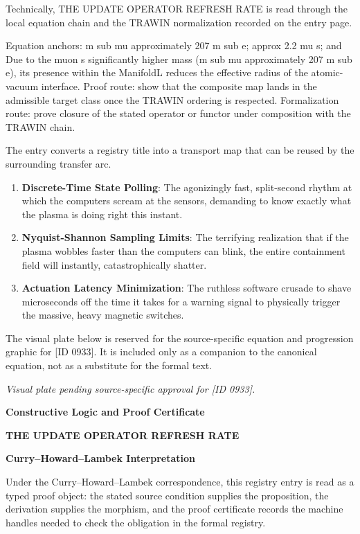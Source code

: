 Technically, THE UPDATE OPERATOR REFRESH RATE is read through the local equation chain and the TRAWIN normalization recorded on the entry page.

Equation anchors: m sub mu approximately 207 m sub e; approx 2.2 mu s; and Due to the muon s significantly higher mass (m sub mu approximately 207 m sub e), its presence within the ManifoldL reduces the effective radius of the atomic-vacuum interface. Proof route: show that the composite map lands in the admissible target class once the TRAWIN ordering is respected. Formalization route: prove closure of the stated operator or functor under composition with the TRAWIN chain.

The entry converts a registry title into a transport map that can be reused by the surrounding transfer arc.
\endgroup

\begin{enumerate}[leftmargin=1.6em,itemsep=6pt,topsep=4pt]
\item \textbf{Discrete-Time State Polling}: The agonizingly fast, split-second rhythm at which the computers scream at the sensors, demanding to know exactly what the plasma is doing right this instant.
\item \textbf{Nyquist-Shannon Sampling Limits}: The terrifying realization that if the plasma wobbles faster than the computers can blink, the entire containment field will instantly, catastrophically shatter.
\item \textbf{Actuation Latency Minimization}: The ruthless software crusade to shave microseconds off the time it takes for a warning signal to physically trigger the massive, heavy magnetic switches.
\end{enumerate}

\begingroup\footnotesize\sloppy
The visual plate below is reserved for the source-specific equation and progression graphic for [ID 0933]. It is included only as a companion to the canonical equation, not as a substitute for the formal text.
\par\endgroup
\begingroup\footnotesize\itshape
Visual plate pending source-specific approval for [ID 0933].
\par\endgroup

\clearpage
\begingroup\tzpsupportsetup
\noindent\textbf{\fontsize{10.8pt}{12.8pt}\selectfont [ID 0933] Constructive Logic and Proof Certificate}\par
\noindent\textbf{\fontsize{10pt}{12pt}\selectfont THE UPDATE OPERATOR REFRESH RATE}\par
\vspace{0.45em}
\begingroup
\footnotesize
\setlength{\parskip}{0.22em}
\setlength{\parindent}{0pt}
\noindent\textbf{Curry--Howard--Lambek Interpretation}\par
Under the Curry--Howard--Lambek correspondence, this registry entry is read as a typed proof
object: the stated source condition supplies the proposition, the derivation supplies the
morphism, and the proof certificate records the machine handles needed to check the obligation
in the formal registry.

